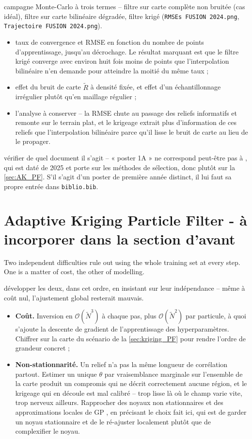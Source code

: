 {campagne Monte-Carlo à trois termes -- filtre sur carte complète non bruitée (cas idéal), filtre sur carte bilinéaire dégradée, filtre krigé (\texttt{RMSEs FUSION 2024.png}, \texttt{Trajectoire FUSION 2024.png}).}
\begin{itemize}
	\item taux de convergence et RMSE en fonction du nombre de points d'apprentissage, jusqu'au décrochage. Le résultat marquant est que le filtre krigé converge avec environ huit fois moins de points que l'interpolation bilinéaire n'en demande pour atteindre la moitié du même taux ;
	\item effet du bruit de carte $\tilde{R}$ à densité fixée, et effet d'un échantillonnage irrégulier plutôt qu'en maillage régulier ;
	\item l'analyse à conserver -- la RMSE chute au passage des reliefs informatifs et remonte sur le terrain plat, et le krigeage extrait plus d'information de ces reliefs que l'interpolation bilinéaire parce qu'il lisse le bruit de carte au lieu de le propager.
\end{itemize}

{vérifier de quel document il s'agit -- « poster 1A » ne correspond peut-être pas à \cite{bib:data-selection}, qui est daté de 2025 et porte sur les méthodes de sélection, donc plutôt sur la \cref{sec:AK_PF}. S'il s'agit d'un poster de première année distinct, il lui faut sa propre entrée dans \texttt{biblio.bib}.}

\section{Adaptive Kriging Particle Filter - à incorporer dans la section d'avant}\label{sec:AK_PF1}

Two independent difficulties rule out using the whole training set at every step. One is a matter of cost, the other of modelling.

{développer les deux, dans cet ordre, en insistant sur leur indépendance -- même à coût nul, l'ajustement global resterait mauvais.}
\begin{itemize}
	\item \textbf{Coût.} Inversion en $\mathcal{O}(\tilde{N}^3)$ à chaque pas, plus $\mathcal{O}(\tilde{N}^2)$ par particule, à quoi s'ajoute la descente de gradient de l'apprentissage des hyperparamètres. Chiffrer sur la carte du scénario de la \cref{sec:kriging_PF} pour rendre l'ordre de grandeur concret ;
	\item \textbf{Non-stationnarité.} Un relief n'a pas la même longueur de corrélation partout. Estimer un unique $\theta$ par vraisemblance marginale sur l'ensemble de la carte produit un compromis qui ne décrit correctement aucune région, et le krigeage qui en découle est mal calibré -- trop lisse là où le champ varie vite, trop nerveux ailleurs. Rapprocher des noyaux non stationnaires \cite{bib:non-stationary-GP} et des approximations locales de GP \cite{bib:local-GP}, en précisant le choix fait ici, qui est de garder un noyau stationnaire et de le ré-ajuster localement plutôt que de complexifier le noyau.
\end{itemize}

